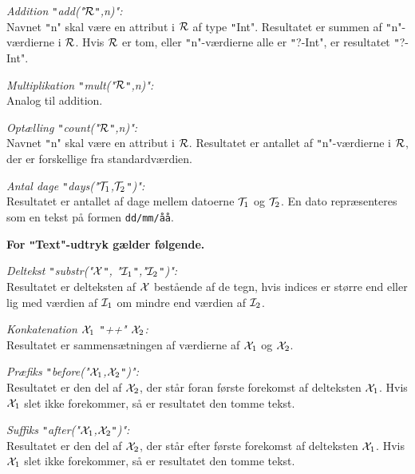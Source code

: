 \documentclass{article}
\newcounter{eks}
\begin{document}
{\em Addition \texttt"add("$\cal R$\texttt",n)":}\\
Navnet \texttt"n" skal v\ae{}re en attribut i $\cal R$ af type \texttt"Int".
Resultatet er summen af \texttt"n"-v\ae{}rdierne i $\cal R$. Hvis 
$\cal R$ er tom, eller \texttt"n"-v\ae{}rdierne alle er \texttt"?-Int", er
resultatet \texttt"?-Int".

{\em Multiplikation \texttt"mult("$\cal R$\texttt",n)":}\\
Analog til addition.

{\em Opt\ae{}lling \texttt"count("$\cal R$\texttt",n)":}\\
Navnet \texttt"n" skal v\ae{}re en attribut i $\cal R$.
Resultatet er antallet af \texttt"n"-v\ae{}rdierne i $\cal R$, der er
forskellige fra standardv\ae{}rdien.

{\em Antal dage \texttt"days("${\cal T}_1$,${\cal T}_2$\texttt")":}\\
Resultatet er antallet af dage mellem datoerne ${\cal T}_1$ og ${\cal T}_2$.
En dato repr\ae{}senteres som en tekst p\aa{} formen {\tt dd/mm/\aa{}\aa{}}.

{\bf For \texttt"Text"-udtryk g\ae{}lder f\o{}lgende.}

{\em Deltekst \texttt"substr("$\cal X$\texttt", "${\cal I}_1$\texttt","${\cal I}_2$\texttt")":}\\
Resultatet er delteksten af $\cal X$ best\aa{}ende af de tegn, hvis
indices er st\o{}rre end eller lig med v\ae{}rdien af 
${\cal I}_1$ om mindre end v\ae{}rdien af ${\cal I}_2$.

{\em Konkatenation ${\cal X}_1$ \texttt"++" ${\cal X}_2$:}\\
Resultatet er sammens\ae{}tningen af v\ae{}rdierne af
${\cal X}_1$ og ${\cal X}_2$.

{\em Pr\ae{}fiks \texttt"before("${\cal X}_1$,${\cal X}_2$\texttt")":}\\
Resultatet er den del af ${\cal X}_2$, der st\aa{}r foran f\o{}rste forekomst af
delteksten ${\cal X}_1$. Hvis ${\cal X}_1$ slet ikke forekommer, s\aa{} er
resultatet den tomme tekst.

{\em Suffiks \texttt"after("${\cal X}_1$,${\cal X}_2$\texttt")":}\\
Resultatet er den del af ${\cal X}_2$, der st\aa{}r efter f\o{}rste forekomst af
delteksten ${\cal X}_1$. Hvis ${\cal X}_1$ slet ikke forekommer, s\aa{} er
resultatet den tomme tekst.
\end{document}
